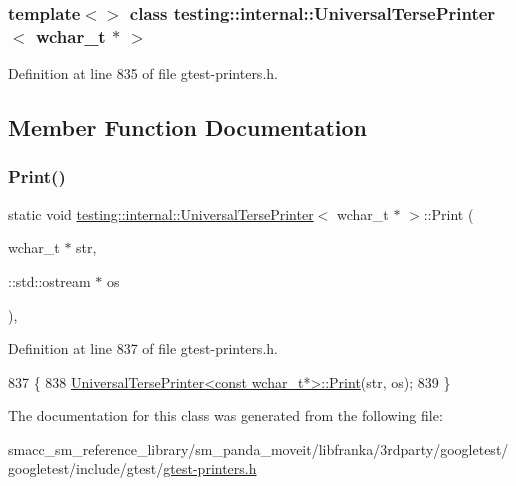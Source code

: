 \subsubsection*{template$<$$>$\newline
class testing\+::internal\+::\+Universal\+Terse\+Printer$<$ wchar\+\_\+t $\ast$ $>$}



Definition at line 835 of file gtest-\/printers.\+h.



\subsection{Member Function Documentation}
\mbox{\label{classtesting_1_1internal_1_1UniversalTersePrinter_3_01wchar__t_01_5_01_4_a9cdf673b44d19e6879253f30f11cd740}} 
\subsubsection{\texorpdfstring{Print()}{Print()}}
{\footnotesize\ttfamily static void \hyperlink{classtesting_1_1internal_1_1UniversalTersePrinter}{testing\+::internal\+::\+Universal\+Terse\+Printer}$<$ wchar\+\_\+t $\ast$ $>$\+::Print (\begin{DoxyParamCaption}\item[{wchar\+\_\+t $\ast$}]{str,  }\item[{\+::std\+::ostream $\ast$}]{os }\end{DoxyParamCaption})\hspace{0.3cm}{\ttfamily [inline]}, {\ttfamily [static]}}



Definition at line 837 of file gtest-\/printers.\+h.


\begin{DoxyCode}
837                                                   \{
838     \hyperlink{classtesting_1_1internal_1_1UniversalTersePrinter_a042249cdb42fdb77588c9ad54ea7ed54}{UniversalTersePrinter<const wchar\_t*>::Print}(str, os);
839   \}
\end{DoxyCode}


The documentation for this class was generated from the following file\+:\begin{DoxyCompactItemize}
\item 
smacc\+\_\+sm\+\_\+reference\+\_\+library/sm\+\_\+panda\+\_\+moveit/libfranka/3rdparty/googletest/googletest/include/gtest/\hyperlink{gtest-printers_8h}{gtest-\/printers.\+h}\end{DoxyCompactItemize}
